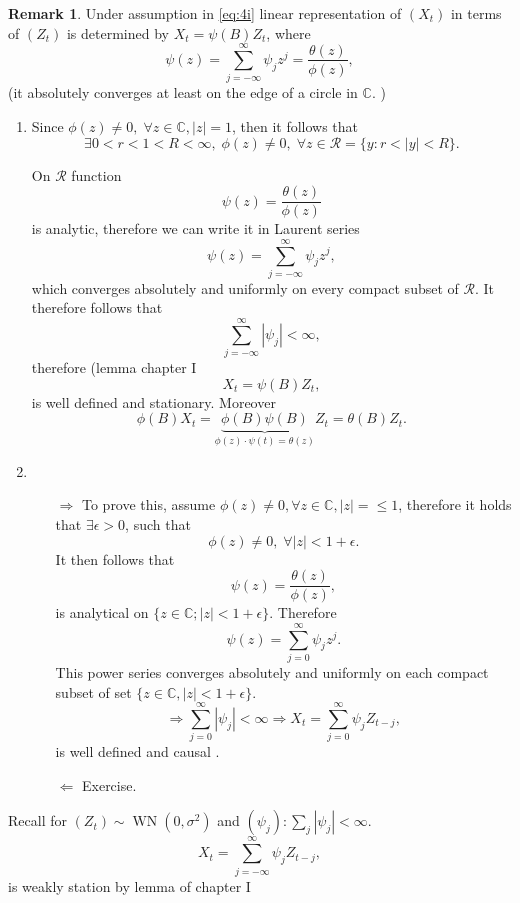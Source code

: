 \documentclass[12pt,a4paper, notitlepage]{book}
\theoremstyle{definition} %
\newtheorem*{remark}{Remark}
\theoremstyle{plain} %
\newcommand{\C}{\mathbb C}
\DeclareMathOperator{\Wn}{WN}
\begin{document}
\begin{remark} 
Under assumption in \ref{eq:4i} linear representation of $ (X_t) $ in 
terms of $ (Z_t ) $ is determined by $ X_t = \psi (B) Z_t $, where
\[ \psi (z) = \sum_{j=- \infty} ^{\infty} \psi _j z^j = \frac{ \theta(z) }{ \phi(z)} , \]
(it absolutely converges at least on the edge of a circle in $ \C $. )
\end{remark}
\proof 
\begin{enumerate}
\item
 Since $ \phi (z) \neq 0 , \; \forall z \in \C , |z| = 1 $, then  it follows that
\[ \exists 0 < r < 1 < R < \infty ,  \; \phi (z) \neq 0 , \; \forall z \in \mathcal{R} = \{ y: r < |y| < R \} . \]
 
On $ \mathcal{R} $ function 
\[ \psi (z) = \frac{ \theta(z) }{\phi(z)}  \] 
is analytic, therefore we can write it in Laurent series 
\[ \psi (z) = \sum _{j=- \infty } ^{\infty} \psi _j z^j , \] 
which converges absolutely and uniformly on every compact subset of $ \mathcal {R} $.
It therefore follows that
\[    \sum _{j=- \infty} ^{\infty} | \psi _j | <  \infty  , \]
therefore  (lemma chapter I %
\[ X_t = \psi (B) Z_t , \]
is well defined and stationary. Moreover 
\[ \phi (B) X_t  = \underbrace{ \phi(B) \psi(B) } _{ \phi(z) \cdot \psi(t) = \theta(z) } Z_t = \theta (B) Z_t . \]

\item
\begin{itemize}
\item[$\Rightarrow$] To prove this, assume $ \phi (z) \neq 0 , \forall z \in \C, |z| =  \leq 1 $, therefore it holds that $ \exists \epsilon >0 $, such that 
\[ \phi (z) \neq 0 ,  \; \forall |z| < 1 + \epsilon . \]
It then follows that 
\[ \psi (z) = \frac{ \theta (z) }{ \phi (z) } , \] 
is analytical on $ \{ z \in \C ; |z| <1 + \epsilon \} $. Therefore
\[ \psi (z) = \sum _{j=0} ^{\infty}  \psi _j z^j . \] 
This power series converges absolutely and uniformly on each compact subset of set $ \{ z \in \C, |z| < 1 + \epsilon \} $.
\[ \Rightarrow \sum _{j=0} ^{\infty} |\psi _j | < \infty \Rightarrow X_t = \sum _{j=0} ^{\infty} \psi _j Z_{t-j} , \]
is well defined and 
causal .
\item[$\Leftarrow $] Exercise.
\end{itemize}
\end{enumerate}

Recall for $ (Z_t) \sim \Wn(0, \sigma ^2) $ and $ ( \psi _j) : \sum _j |\psi _j | < \infty $.
\[ X_t = \sum _{j= - \infty }^{\infty} \psi _j Z_{t-j} , \]
is weakly station by lemma of chapter I %
\end{document}
